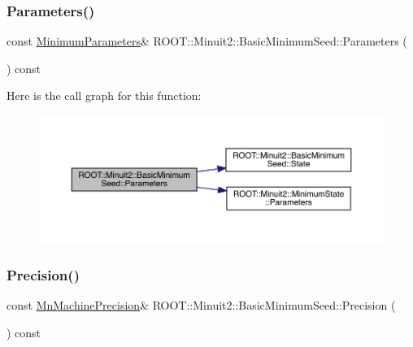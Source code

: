 \subsubsection{\texorpdfstring{Parameters()}{Parameters()}\hspace{0.1cm}{\footnotesize\ttfamily [3/3]}}
{\footnotesize\ttfamily const \mbox{\hyperlink{classROOT_1_1Minuit2_1_1MinimumParameters}{Minimum\+Parameters}}\& R\+O\+O\+T\+::\+Minuit2\+::\+Basic\+Minimum\+Seed\+::\+Parameters (\begin{DoxyParamCaption}{ }\end{DoxyParamCaption}) const\hspace{0.3cm}{\ttfamily [inline]}}

Here is the call graph for this function\+:
\nopagebreak
\begin{figure}[H]
\begin{center}
\leavevmode
\includegraphics[width=350pt]{de/d50/classROOT_1_1Minuit2_1_1BasicMinimumSeed_a0aec3622cdc4f1c52a4be74f8b96059a_cgraph}
\end{center}
\end{figure}
\mbox{\label{classROOT_1_1Minuit2_1_1BasicMinimumSeed_af06c66e8851f7314915e01e0bedb200c}} 
\subsubsection{\texorpdfstring{Precision()}{Precision()}\hspace{0.1cm}{\footnotesize\ttfamily [1/3]}}
{\footnotesize\ttfamily const \mbox{\hyperlink{classROOT_1_1Minuit2_1_1MnMachinePrecision}{Mn\+Machine\+Precision}}\& R\+O\+O\+T\+::\+Minuit2\+::\+Basic\+Minimum\+Seed\+::\+Precision (\begin{DoxyParamCaption}{ }\end{DoxyParamCaption}) const\hspace{0.3cm}{\ttfamily [inline]}}


